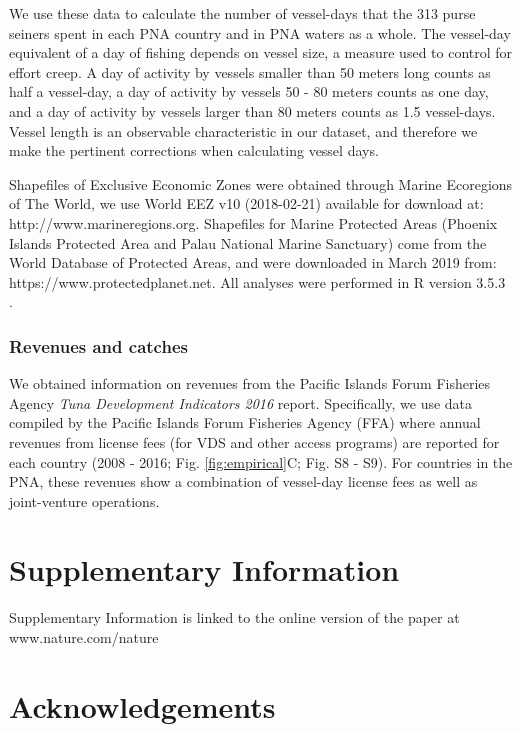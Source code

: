\documentclass[12pt]{article}
\begin{document}
We use these data to calculate the number of vessel-days that the 313 purse seiners spent in each PNA country and in PNA waters as a whole. The vessel-day equivalent of a day of fishing depends on vessel size, a measure used to control for effort creep. A day of activity by vessels smaller than 50 meters long counts as half a vessel-day, a day of activity by vessels 50 - 80 meters counts as one day, and a day of activity by vessels larger than 80 meters counts as 1.5 vessel-days. Vessel length is an observable characteristic in our dataset, and therefore we make the pertinent corrections when calculating vessel days.

Shapefiles of Exclusive Economic Zones were obtained through Marine Ecoregions of The World, we use World EEZ v10 (2018-02-21) available for download at: http://www.marineregions.org. Shapefiles for Marine Protected Areas (Phoenix Islands Protected Area and Palau National Marine Sanctuary) come from the World Database of Protected Areas, and were downloaded in March 2019 from: https://www.protectedplanet.net. All analyses were performed in R version 3.5.3 \cite{rcore_2018}.

\subsubsection{Revenues and catches}

We obtained information on revenues from the Pacific Islands Forum Fisheries Agency \emph{Tuna Development Indicators 2016} report.  Specifically, we use data compiled by the Pacific Islands Forum Fisheries Agency (FFA\cite{ffa_2017}) where annual revenues from license fees (for VDS and other access programs) are reported for each country (2008 - 2016; Fig. \ref{fig:empirical}C; Fig. S8 - S9). For countries in the PNA, these revenues show a combination of vessel-day license fees as well as joint-venture operations.





\section{Supplementary Information}

Supplementary Information is linked to the online version of the paper at www.nature.com/nature

\section{Acknowledgements}
\end{document}
